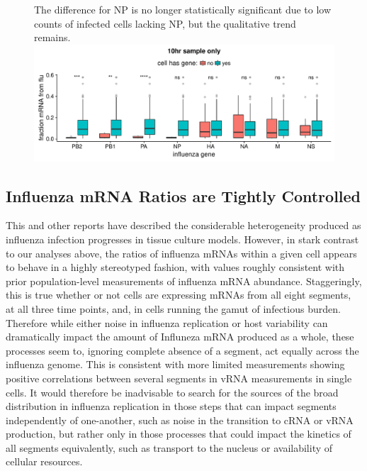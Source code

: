 \documentclass[9pt,lineno]{elife}
\begin{document}
\begin{figure}
{The difference for NP is no longer statistically significant due to low counts of infected cells lacking NP, but the qualitative trend remains.
}{\includegraphics[width=\linewidth]{figures/p_10hr_flu_burden_flu_gene_test}}
\end{figure}


	
\subsection{Influenza mRNA Ratios are Tightly Controlled}
	
	This and other reports have described the considerable heterogeneity produced as influenza infection progresses in tissue culture models. 
	However, in stark contrast to our analyses above, the ratios of influenza mRNAs within a given cell appears to behave in a highly stereotyped fashion, with values roughly consistent with prior population-level measurements of influenza mRNA abundance. 
	Staggeringly, this is true whether or not cells are expressing mRNAs from all eight segments, at all three time points,  and, in cells running the gamut of infectious burden.
	Therefore while either noise in influenza replication or host variability can dramatically impact the amount of Influneza mRNA produced as a whole, these processes seem to, ignoring complete absence of a segment, act equally across the influenza genome.
	This is consistent with more limited measurements showing positive correlations between several segments in vRNA measurements in single cells.
	It would therefore be inadvisable to search for the sources of the broad distribution in influenza replication in those steps that can impact segments independently of one-another, such as noise in the transition to cRNA or vRNA production, but rather only in those processes that could impact the kinetics of all segments equivalently, such as transport to the nucleus or availability of cellular resources. 
\end{document}

